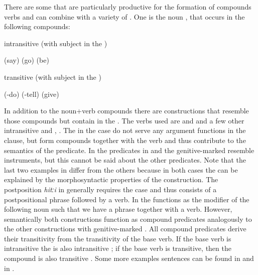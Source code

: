 There are some  that are particularly productive for the formation of compounds verbs and can combine with a variety of . One is the noun  , that occurs in the following compounds:
%
\begin{exe}
	\ex	intransitive  (with subject in the )	\label{ex:wordcompoundsintransitive}
	\begin{xlist}
		\ex	{}  (say)  
		\ex	{}  (go)  
		\ex	{}  (be)  
	\end{xlist}

	\ex	transitive (with subject in the )	\label{ex:wordcompoundstransitive}
	\begin{xlist}
		\ex	{}  (-do) \sqt{say, tell} 
		\ex	{}  (-tell) \sqt{say, tell} 
		\ex	{}  (give) \sqt{promise}
	\end{xlist}
\end{exe}

In addition to the noun+verb compounds there are constructions that resemble those compounds but contain  in the . The verbs used are   and   and a few other intransitive and  ,  . The  in the  case do not serve any argument functions in the clause, but form compounds together with the verb and thus contribute to the semantics of the predicate. In the predicates in  and  the genitive-marked  resemble instruments, but this cannot be said about the other predicates. Note that the last two examples in  differ from the others because in both cases the  can be explained by the morphosyntactic properties of the construction. The postposition \textit{hitːi} in  generally requires the  case and thus  consists of a postpositional phrase followed by a verb. In  the  functions as the modifier of the following noun such that we have a  phrase together with a verb. However, semantically both constructions function as compound predicates analogously to the other constructions with genitive-marked . All compound predicates derive their transitivity from the transitivity of the base verb. If the base verb is intransitive the  is also intransitive  ; if the base verb is transitive, then the compound is also transitive . Some more examples sentences can be found in  and in . 

